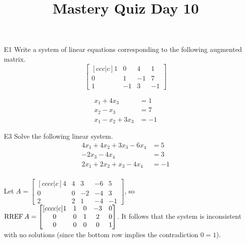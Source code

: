 \documentclass{sbgLAquiz}
\title{Mastery Quiz Day 10 }
\begin{document}
\begin{problem}{E1}
Write a system of linear equations corresponding to the following
augmented matrix.
\[
\begin{bmatrix}[ccc|c]
1 & 0 & 4 & 1 \\
0 & 1 & -1 & 7 \\
1 & -1 & 3 & -1
\end{bmatrix}
\]
\end{problem}
\begin{solution}
\begin{align*}
x_1+4x_3 &= 1 \\
x_2-x_3 &= 7 \\
x_1-x_2+3x_3 &= -1
\end{align*}
\end{solution}
\begin{problem}{E3}
Solve the following linear system.
\begin{align*}
4x_1+4x_2+3x_3-6x_4 &= 5 \\
-2x_3-4x_4 &= 3 \\
2x_1+2x_2+x_3-4x_4 &= -1 \\
\end{align*}
\end{problem}
\begin{solution}
Let \(A =
  \begin{bmatrix}[cccc|c]
    4 & 4 & 3 & -6 & 5 \\
    0 & 0 & -2 & -4 & 3 \\
    2 & 2 & 1 & -4 & -1
  \end{bmatrix}
\), so \(\operatorname{RREF} A =
  \begin{bmatrix}[cccc|c]
    1 & 1 & 0 & -3 & 0 \\
    0 & 0 & 1 & 2 & 0 \\
    0 & 0 & 0 & 0 & 1
  \end{bmatrix}
\). It follows that the system is inconsistent with no solutions
(since the bottom row implies the contradiction \(0=1\)).
\end{solution}
\end{document}
